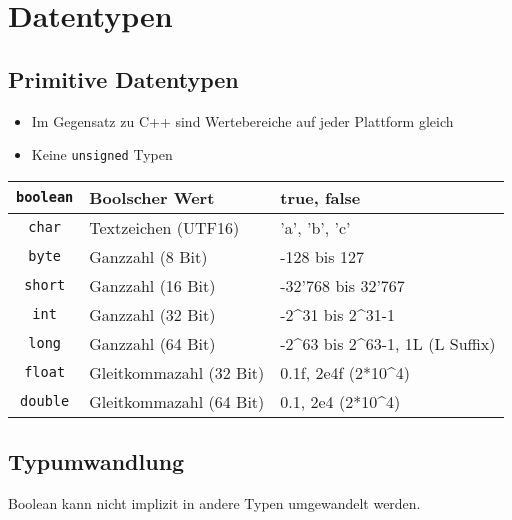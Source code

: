\section{Datentypen}
\subsection{Primitive Datentypen}
\begin{itemize}
    \item Im Gegensatz zu C++ sind Wertebereiche auf jeder Plattform gleich
    \item Keine \texttt{unsigned} Typen
\end{itemize}

\begin{center}
    \begin{tabularx}{0.82\columnwidth}{@{}c l l@{}}
        \lstinline{boolean}    & Boolscher Wert        & true, false\\\hline
        \lstinline{char}       & Textzeichen (UTF16)   & 'a', 'b', 'c'\\\hline
        \lstinline{byte}       & Ganzzahl (8 Bit)             & -128 bis 127\\\hline
        \lstinline{short}      & Ganzzahl (16 Bit)             & -32'768 bis 32'767\\\hline
        \lstinline{int}        & Ganzzahl (32 Bit)             & -2^{31} bis 2^{31}-1\\\hline
        \lstinline{long}       & Ganzzahl (64 Bit)             & -2^{63} bis 2^{63}-1, 1L (L Suffix)\\\hline
        \lstinline{float}      & Gleitkommazahl (32 Bit)       & 0.1f, 2e4f (2*10^4)\\\hline
        \lstinline{double}     & Gleitkommazahl (64 Bit)       & 0.1, 2e4 (2*10^4)\\
    \end{tabularx}
\end{center}

\subsection{Typumwandlung}
\begin{minipage}{0.6\columnwidth}
\end{minipage}
\begin{minipage}{0.35\columnwidth}
    Boolean kann nicht implizit in andere Typen umgewandelt werden.
\end{minipage}

